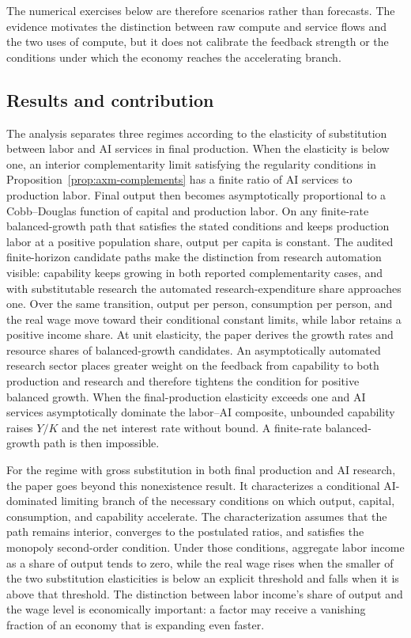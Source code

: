 The numerical exercises below are therefore scenarios rather than forecasts. The
evidence motivates the distinction between raw compute and service flows and the
two uses of compute, but it does not calibrate the feedback strength or the
conditions under which the economy reaches the accelerating branch.

\subsection{Results and contribution}

The analysis separates three regimes according to the elasticity of substitution
between labor and AI services in final production. When the elasticity is below
one, an interior complementarity limit satisfying the regularity conditions in
Proposition~\ref{prop:axm-complements} has a finite ratio of AI services to
production labor. Final output then becomes asymptotically proportional to a
Cobb--Douglas function of capital and production labor. On any finite-rate
balanced-growth path that satisfies the stated conditions and keeps production
labor at a positive population share, output per capita is constant. The audited
finite-horizon candidate paths make the distinction from research automation
visible: capability keeps growing in both reported complementarity cases, and
with substitutable research the automated research-expenditure share approaches
one. Over the same transition, output per person, consumption per person, and the
real wage move toward their conditional constant limits, while labor retains a
positive income share. At unit elasticity, the paper
derives the growth rates and resource shares of balanced-growth candidates. An
asymptotically automated research sector places greater weight on the feedback
from capability to both production and research and therefore tightens the
condition for positive balanced growth. When the final-production elasticity
exceeds one and AI services asymptotically dominate the labor--AI composite,
unbounded capability raises \(Y/K\) and the net interest rate without bound. A finite-rate
balanced-growth path is then impossible.

For the regime with gross substitution in both final production and AI research,
the paper goes beyond this nonexistence result.
It characterizes a conditional AI-dominated limiting branch of the necessary
conditions on which output, capital, consumption, and capability accelerate. The characterization assumes
that the path remains interior, converges to the postulated ratios, and satisfies
the monopoly second-order condition. Under those conditions,
aggregate labor income as a share of output tends to zero, while the real wage
rises when the smaller of the two substitution elasticities is below an explicit
threshold and falls when it is above that threshold. The distinction between labor income's
share of output and the wage level is economically important: a factor may
receive a vanishing fraction of an economy that is expanding even faster.

